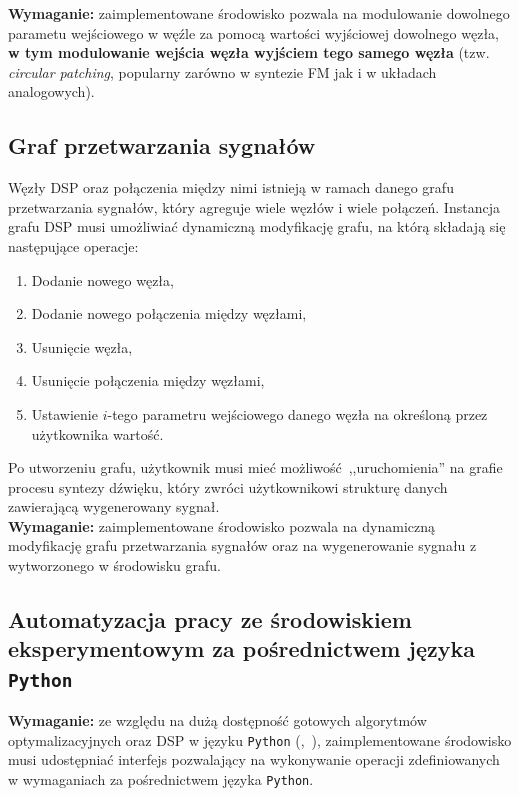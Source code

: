 \noindent
\textbf{Wymaganie:} zaimplementowane środowisko pozwala na modulowanie
dowolnego parametu wejściowego w węźle za pomocą wartości wyjściowej dowolnego węzła,
\textbf{w tym modulowanie wejścia węzła wyjściem tego samego węzła} (tzw. \textit{circular patching},
popularny zarówno w syntezie FM jak i w układach analogowych).

\subsection{Graf przetwarzania sygnałów}

Węzły DSP oraz połączenia między nimi istnieją w ramach danego grafu przetwarzania sygnałów, który agreguje
wiele węzłów i wiele połączeń. Instancja grafu DSP musi umożliwiać dynamiczną modyfikację grafu, na którą składają się następujące operacje:

\begin{enumerate}
  \item Dodanie nowego węzła,
  \item Dodanie nowego połączenia między węzłami,
  \item Usunięcie węzła,
  \item Usunięcie połączenia między węzłami,
  \item Ustawienie $i$-tego parametru wejściowego danego węzła na określoną przez użytkownika wartość.
\end{enumerate}

\noindent
Po utworzeniu grafu, użytkownik musi mieć możliwość~,,uruchomienia'' na grafie procesu syntezy dźwięku,
który zwróci użytkownikowi strukturę danych zawierającą wygenerowany sygnał. \\

\noindent
\textbf{Wymaganie:} zaimplementowane środowisko pozwala na dynamiczną modyfikację grafu przetwarzania sygnałów oraz na 
wygenerowanie sygnału z wytworzonego w środowisku grafu.


\subsection{Automatyzacja pracy ze środowiskiem eksperymentowym za pośrednictwem języka \texttt{Python}}

\textbf{Wymaganie:} ze względu na dużą dostępność gotowych algorytmów optymalizacyjnych oraz DSP w języku \texttt{Python}
(\cite{librosa},~\cite{2020SciPy-NMeth}), zaimplementowane środowisko musi udostępniać interfejs pozwalający
na wykonywanie operacji zdefiniowanych w wymaganiach za pośrednictwem języka \texttt{Python}.


